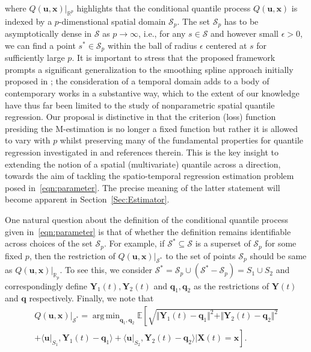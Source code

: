 \documentclass[aos]{imsart}
\theoremstyle{plain}
\theoremstyle{remark}
\def\E{\mathbb{E}}
\def\R{\mathbb{R}}
\newcommand{\Scal}{\mathcal{S}}
\DeclareMathOperator*{\argmin}{arg\,min}
\newcommand{\bb}[1]{\boldsymbol{#1}}
\begin{document}
where $Q(\bb{u} ,\bb{x})\vert_{\R^p}$ highlights that the conditional quantile process $Q(\bb{u} ,\bb{x})$ is indexed by a $p$-dimenstional spatial domain $\Scal_p$. The set $\Scal_p$ has to be asymptotically dense in $\Scal$ as $p \rightarrow \infty$, i.e., for any $s \in \Scal$ and however small $\epsilon > 0$, we can find a point $s^\ast \in \Scal_p$ within the ball of radius $\epsilon$ centered at $s$ for sufficiently large $p$.  It is important to stress that the proposed framework prompts a significant generalization to the smoothing spline approach initially proposed in \cite{koenkeretal94}; the consideration of a temporal domain adds to a body of contemporary works in a substantive way, which to the extent of our knowledge have thus far been limited to the study of nonparametric spatial quantile regression. Our proposal is distinctive in that the criterion (loss) function presiding the M-estimation is no longer a fixed function but rather it is allowed to vary with $p$ whilst preserving many of the fundamental properties for quantile regression investigated in \cite{ChowChau19} and references therein. This is the key insight to extending the notion of a spatial (multivariate) quantile across a direction, towards the aim of tackling the spatio-temporal regression estimation problem posed in~\eqref{eqn:parameter}. The precise meaning of the latter statement will become apparent in Section~\ref{Sec:Estimator}.

One natural question about the definition of the conditional quantile process given in~\eqref{eqn:parameter} is that of whether the definition remains identifiable across choices of the set $\Scal_p$. For example, if $\Scal^\ast \subseteq \Scal$ is a superset of $\Scal_p$ for some fixed $p$, then the restriction of $Q(\bb{u}, \bb{x})\vert_{\Scal^\ast}$ to the set of points $\Scal_p$ should be same as $Q(\bb{u}, \bb{x})\vert_{\R_p}$. To see this, we consider $\Scal^\ast = \Scal_p \cup (\Scal^\ast - \Scal_p) = S_1 \cup S_2$ and correspondingly define $\bb{Y}_1(t), \bb{Y}_2(t)$ and $\bb{q}_1, \bb{q}_2$ as the restrictions of $\bb{Y}(t)$ and $\bb{q}$ respectively. Finally, we note that
\begin{multline*}
    Q(\bb{u}, \bb{x})\vert_{\Scal^\ast} = \argmin_{\bb{q}_1, \bb{q}_2} \E\left[ \sqrt{\Vert \bb{Y}_1(t) - \bb{q}_1\Vert^2 + \Vert \bb{Y}_2(t) - \bb{q}_2\Vert^2 } \right. \\
    \left. + \langle \bb{u}\vert_{S_1}, \bb{Y}_1(t) - \bb{q}_1 \rangle + \langle \bb{u}\vert_{S_2}, \bb{Y}_2(t) - \bb{q}_2 \rangle \vert \bb{X}(t) = \bb{x} \right].
\end{multline*}
\end{document}
